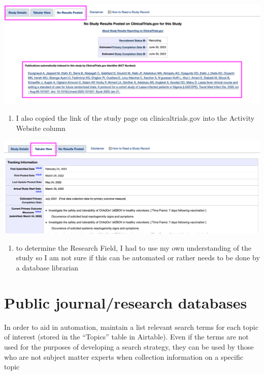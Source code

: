 \documentclass[
]{book}
\providecommand{\tightlist}{%
  \setlength{\itemsep}{0pt}\setlength{\parskip}{0pt}}
\begin{document}
\includegraphics{images/clinicaltrial7.png}

\begin{enumerate}
\def\labelenumi{\arabic{enumi}.}
\setcounter{enumi}{17}
\tightlist
\item
  I also copied the link of the study page on clinicaltrials.gov into the Activity Website column
\end{enumerate}

\includegraphics{images/clinicaltrial8.png}

\begin{enumerate}
\def\labelenumi{\arabic{enumi}.}
\setcounter{enumi}{18}
\tightlist
\item
  to determine the Research Field, I had to use my own understanding of the study so I am not sure if this can be automated or rather needs to be done by a database librarian
\end{enumerate}

\hypertarget{update-public-research}{%
\section{Public journal/research databases}\label{update-public-research}}

In order to aid in automation, maintain a list relevant search terms for each topic of interest (stored in the ``Topics'' table in Airtable). Even if the terms are not used for the purposes of developing a search strategy, they can be used by those who are not subject matter experts when collection information on a specific topic
\end{document}
